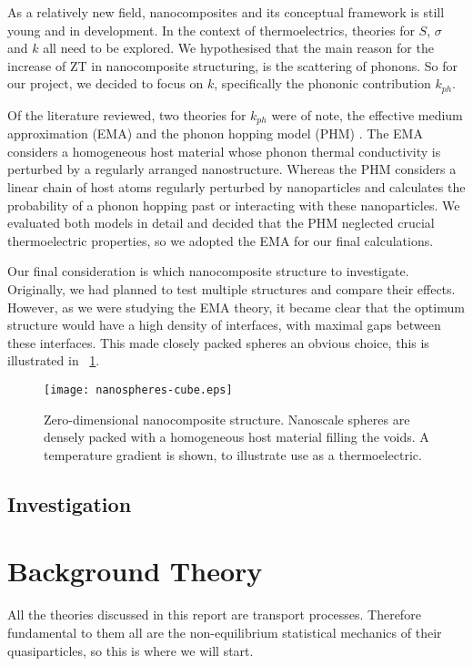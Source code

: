 \documentclass[12pt,draft]{article}
\newcommand{\figref}[2][\figurename~]{#1\ref{#2}}
\begin{document}
As a relatively new field, nanocomposites and its conceptual framework is still young and in development. In the context of thermoelectrics, theories for $S$, $\sigma$ and $k$ all need to be explored. We hypothesised that the main reason for the increase of ZT in nanocomposite structuring, is the scattering of phonons. So for our project, we decided to focus on $k$, specifically the phononic contribution $k_{ph}$. 

Of the literature reviewed, two theories for $k_{ph}$ were of note, the effective medium approximation (EMA) \cite{ema} and the phonon hopping model (PHM) \cite{phm}. The EMA considers a homogeneous host material whose phonon thermal conductivity is perturbed by a regularly arranged nanostructure. Whereas the PHM considers a linear chain of host atoms regularly perturbed by nanoparticles and calculates the probability of a phonon hopping past or interacting with these nanoparticles. We evaluated both models in detail and decided that the PHM neglected crucial thermoelectric properties, so we adopted the EMA for our final calculations.

Our final consideration is which nanocomposite structure to investigate. Originally, we had planned to test multiple structures and compare their effects. However, as we were studying the EMA theory, it became clear that the optimum structure would have a high density of interfaces, with maximal gaps between these interfaces. This made closely packed spheres an obvious choice, this is illustrated in \figref{fig:nanospheres-cube}.

\begin{figure}
	\centering
	\texttt{[image: nanospheres-cube.eps]}
	\caption{Zero-dimensional nanocomposite structure. Nanoscale spheres are densely packed with a homogeneous host material filling the voids. A temperature gradient is shown, to illustrate use as a thermoelectric.}
	\label{fig:nanospheres-cube}
\end{figure}


\subsection{Investigation}

\section{Background Theory}
All the theories discussed in this report are transport processes. Therefore fundamental to them all are the non-equilibrium statistical mechanics of their quasiparticles, so this is where we will start.
\end{document}
